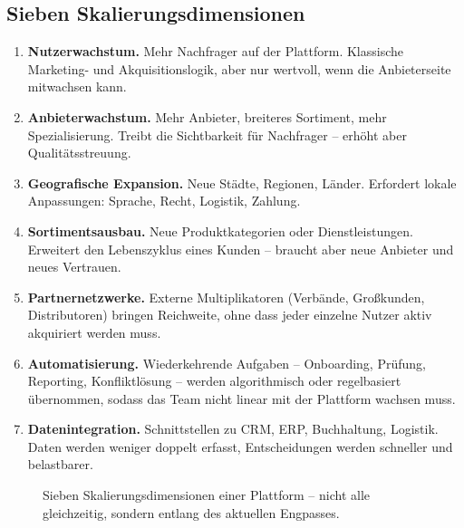 \documentclass[11pt,a4paper,oneside]{article}
\newcommand{\fachbegriff}[1]{\textbf{#1}}
\begin{document}
\subsection{Sieben Skalierungsdimensionen}

\begin{enumerate}
  \item \fachbegriff{Nutzerwachstum.} Mehr Nachfrager auf der Plattform. Klassische Marketing- und Akquisitionslogik, aber nur wertvoll, wenn die Anbieterseite mitwachsen kann.
  \item \fachbegriff{Anbieterwachstum.} Mehr Anbieter, breiteres Sortiment, mehr Spezialisierung. Treibt die Sichtbarkeit für Nachfrager -- erhöht aber Qualitätsstreuung.
  \item \fachbegriff{Geografische Expansion.} Neue Städte, Regionen, Länder. Erfordert lokale Anpassungen: Sprache, Recht, Logistik, Zahlung.
  \item \fachbegriff{Sortimentsausbau.} Neue Produktkategorien oder Dienstleistungen. Erweitert den Lebenszyklus eines Kunden -- braucht aber neue Anbieter und neues Vertrauen.
  \item \fachbegriff{Partnernetzwerke.} Externe Multiplikatoren (Verbände, Großkunden, Distributoren) bringen Reichweite, ohne dass jeder einzelne Nutzer aktiv akquiriert werden muss.
  \item \fachbegriff{Automatisierung.} Wiederkehrende Aufgaben -- Onboarding, Prüfung, Reporting, Konfliktlösung -- werden algorithmisch oder regelbasiert übernommen, sodass das Team nicht linear mit der Plattform wachsen muss.
  \item \fachbegriff{Datenintegration.} Schnittstellen zu CRM, ERP, Buchhaltung, Logistik. Daten werden weniger doppelt erfasst, Entscheidungen werden schneller und belastbarer.
\end{enumerate}

\begin{figure}[h]
\centering
{}
\caption{\sffamily Sieben Skalierungsdimensionen einer Plattform -- nicht alle gleichzeitig, sondern entlang des aktuellen Engpasses.}
\label{fig:skalierungsdimensionen-22t04}
\end{figure}
\end{document}
